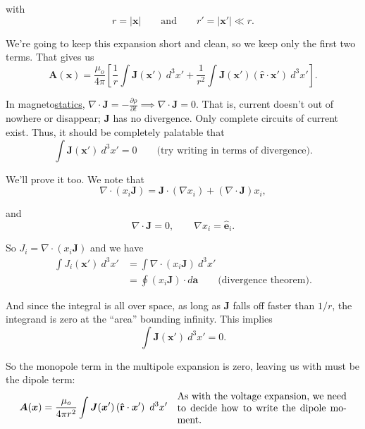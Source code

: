\documentclass{article}
\numberwithin{equation}{section}
\newcommand{\rhat}{\mathbf{\hat{r}}}
\newcommand{\ehat}{\mathbf{\hat{e}}}
\begin{document}
with
\begin{equation*}
    r = \left| \bm{x} \right| \qquad \text{and} \qquad r' = \left| \bm{x}' \right| \ll r.
\end{equation*}

We're going to keep this expansion short and clean, so we keep only the first two terms. That gives us
\begin{equation*}
    \bm{A}(\bm{x}) = \frac{\mu_o}{4\pi} \left[ \frac{1}{r} \int \bm{J}(\bm{x}')\ d^3x' + \frac{1}{r^2} \int \bm{J}(\bm{x}') \left( \rhat \cdot \bm{x}' \right)\ d^3x' \right].
\end{equation*}

In magneto\underline{statics}, $\nabla \cdot \bm{J} = -\frac{\partial \rho}{\partial t} \implies \nabla \cdot \bm{J} = 0$. That is, current doesn't out of nowhere or disappear; $\bm{J}$ has no divergence. Only complete circuits of current exist. Thus, it should be completely palatable that
\begin{equation*}
    \int \bm{J}(\bm{x}')\ d^3x' = 0 \qquad \text{(try writing in terms of divergence).}
\end{equation*}

We'll prove it too. We note that
\begin{equation*}
    \nabla \cdot \left( x_i \bm{J} \right) = \bm{J} \cdot \left( \nabla x_i \right) + \left( \nabla \cdot \bm{J} \right) x_i,
\end{equation*}

and
\begin{equation*}
    \nabla \cdot \bm{J} = 0, \qquad \nabla x_i = \ehat_i.
\end{equation*}

So $J_i = \nabla \cdot \left( x_i \bm{J} \right)$ and we have
\begin{align*}
    \int J_i (\bm{x}')\ d^3x'  &= \int \nabla \cdot \left( x_i \bm{J} \right)\ d^3x' \\
    &= \oint \left( x_i \bm{J} \right) \cdot d\bm{a} \qquad \text{(divergence theorem).}
\end{align*}

And since the integral is all over space, as long as $\bm{J}$ falls off faster than $1/r$, the integrand is zero at the ``area'' bounding infinity. This implies
\begin{equation*}
    \int \bm{J}(\bm{x}')\ d^3x' = 0.
\end{equation*}

So the monopole term in the multipole expansion is zero, leaving us with must be the dipole term:
\begin{align*}
    \bm{A}(\bm{x}) = \frac{\mu_o}{4\pi r^2} \int \bm{J}(\bm{x}') \left( \rhat \cdot \bm{x}' \right)\ d^3x' && \parbox{0.5\textwidth}{As with the voltage expansion, we need to decide how to write the dipole moment.}
\end{align*}
\end{document}
